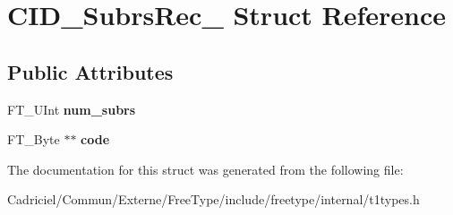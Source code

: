 \hypertarget{struct_c_i_d___subrs_rec__}{\section{C\-I\-D\-\_\-\-Subrs\-Rec\-\_\- Struct Reference}
\label{struct_c_i_d___subrs_rec__}
}
\subsection*{Public Attributes}
\begin{DoxyCompactItemize}
\item 
\hypertarget{struct_c_i_d___subrs_rec___a3abd23388e2e0f4888f826a993953c7e}{F\-T\-\_\-\-U\-Int {\bfseries num\-\_\-subrs}}\label{struct_c_i_d___subrs_rec___a3abd23388e2e0f4888f826a993953c7e}

\item 
\hypertarget{struct_c_i_d___subrs_rec___a1a4f0a4e514492fccaf81d7ede6c4e08}{F\-T\-\_\-\-Byte $\ast$$\ast$ {\bfseries code}}\label{struct_c_i_d___subrs_rec___a1a4f0a4e514492fccaf81d7ede6c4e08}

\end{DoxyCompactItemize}


The documentation for this struct was generated from the following file\-:\begin{DoxyCompactItemize}
\item 
Cadriciel/\-Commun/\-Externe/\-Free\-Type/include/freetype/internal/t1types.\-h\end{DoxyCompactItemize}
